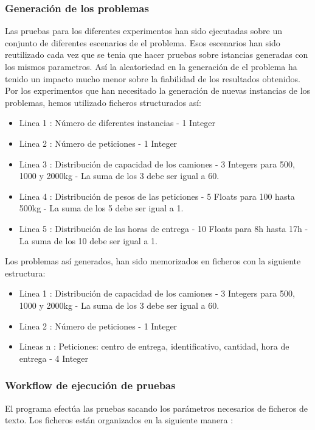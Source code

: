 \documentclass{article}
\begin{document}
\subsubsection{Generación de los problemas}
Las pruebas para los diferentes experimentos han sido ejecutadas sobre un conjunto de diferentes escenarios de el problema. Esos escenarios han sido reutilizado cada vez que se tenia que hacer pruebas sobre istancias generadas con los mismos parametros. Así la aleatoriedad en la generación de el problema ha tenido un impacto mucho menor sobre la fiabilidad de los resultados obtenidos. 
Por los experimentos que han necesitado la generación de nuevas instancias de los problemas, hemos utilizado ficheros structurados así:
\begin{itemize}
\item Linea 1 : Número de diferentes instancias - 1 Integer
\item Linea 2 : Número de peticiones - 1 Integer
\item Linea 3 : Distribución de capacidad de los camiones - 3 Integers para 500,
1000 y 2000kg - La suma de los 3 debe ser igual a 60.
\item Linea 4 : Distribución de pesos de las peticiones - 5 Floats para 100
hasta 500kg - La suma de los 5 debe ser igual a 1.
\item Linea 5 : Distribución de las horas de entrega - 10 Floats para 8h hasta
17h - La suma de los 10 debe ser igual a 1.
\end{itemize}
Los problemas así generados, han sido memorizados en ficheros con la siguiente estructura:
\begin{itemize}
\item Linea 1 : Distribución de capacidad de los camiones - 3 Integers para 500,
1000 y 2000kg - La suma de los 3 debe ser igual a 60.
\item Linea 2 : Número de peticiones - 1 Integer
\item Lineas n : Peticiones: centro de entrega, identificativo, cantidad, hora de entrega - 4 Integer
\end{itemize}

\subsubsection{Workflow de ejecución de pruebas}

El programa efectúa las pruebas sacando los parámetros necesarios de ficheros de
texto. Los ficheros están organizados en la siguiente manera :
\end{document}
